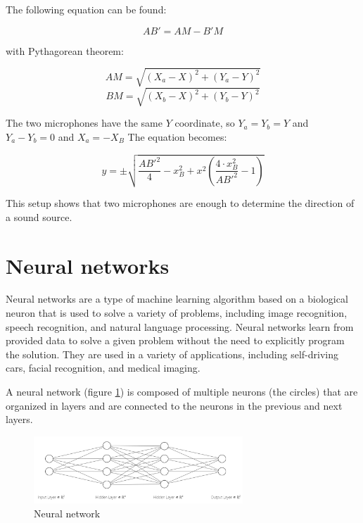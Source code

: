 The following equation can be found:

\begin{equation}
    AB' = AM-B'M
\end{equation}

with Pythagorean theorem: 

\begin{equation}
    AM = \sqrt{(X_{a}-X)^2 + (Y_{a}-Y)^2}
\end{equation}
\begin{equation}
    BM = \sqrt{(X_{b}-X)^2 + (Y_{b}-Y)^2}
\end{equation}

The two microphones have the same $Y$ coordinate, so $Y_{a} = Y_{b} = Y$ and $Y_{a}-Y_{b} = 0$ and $X_{a} = -X_{B}$ The equation becomes:

\begin{equation}
    y = \pm\sqrt{\frac{AB'^2}{4} - x^2_{B} + x^2(\frac{4\cdot x^2_{B}}{AB'^2} - 1)}
\end{equation}

This setup shows that two microphones are enough to determine the direction of a sound source.

\section{Neural networks}

Neural networks are a type of machine learning algorithm based on a biological neuron that is used to solve a variety of problems, including image recognition, speech recognition, and natural language processing. Neural networks learn from provided data to solve a given problem without the need to explicitly program the solution. They are used in a variety of applications, including self-driving cars, facial recognition, and medical imaging. 

A neural network (figure \ref*{fig:neural_network}) is composed of multiple neurons (the circles) that are organized in layers and are connected to the neurons in the previous and next layers. 

\begin{figure}[H]
    \centering
    \includegraphics[width=0.7\textwidth]{../Images/neural_network_example.png}
    \caption{Neural network}
    \label{fig:neural_network}
\end{figure}

